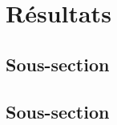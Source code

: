 \section{Résultats}
\noindent

\subsection{Sous-section}
\noindent




\subsection{Sous-section}
\noindent